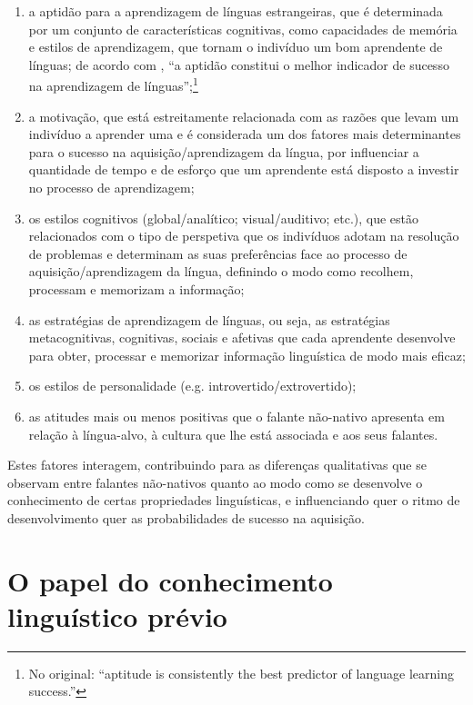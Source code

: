 \documentclass[output=paper]{LSP/langsci}
\begin{document}
\begin{enumerate}
\item a aptidão para a aprendizagem de línguas estrangeiras, que é determinada por um conjunto de características cognitivas, como capacidades de memória e estilos de aprendizagem, que tornam o indivíduo um bom aprendente de línguas; de acordo com \citet[38]{skehan1989}, ``a aptidão constitui o melhor indicador de sucesso na aprendizagem de línguas”;\footnote{No original: ``aptitude is consistently the best predictor of language learning success.''}

\item a motivação, que está estreitamente relacionada com as razões que levam um indivíduo a aprender uma  e é considerada um dos fatores mais determinantes para o sucesso na aquisição/aprendizagem da língua, por influenciar a quantidade de tempo e de esforço que um aprendente está disposto a investir no processo de aprendizagem;

\item os estilos cognitivos (global/analítico; visual/auditivo; etc.), que estão relacionados com o tipo de perspetiva que os indivíduos adotam na resolução de problemas e determinam as suas preferências face ao processo de aquisição/aprendizagem da língua, definindo o modo como recolhem, processam e memorizam a informação;

\item as estratégias de aprendizagem de línguas, ou seja, as estratégias metacognitivas, cognitivas, sociais e afetivas que cada aprendente desenvolve para obter, processar e memorizar informação linguística de modo mais eficaz; 

\item os estilos de personalidade (e.g. introvertido/extrovertido); 

\item as atitudes mais ou menos positivas que o falante não-nativo apresenta em relação à língua-alvo, à cultura que lhe está associada e aos seus falantes.
\end{enumerate}

Estes fatores interagem, contribuindo para as diferenças qualitativas que se observam entre falantes não-nativos quanto ao modo como se desenvolve o conhecimento de certas propriedades linguísticas, e influenciando quer o ritmo de desenvolvimento quer as probabilidades de sucesso na aquisição.

\section{O papel do conhecimento linguístico prévio}
\label{sec:madeira_papel_conhecimento}
\end{document}
